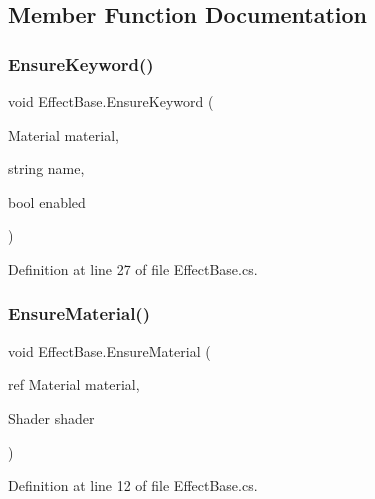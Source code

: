\subsection{Member Function Documentation}
\mbox{\label{class_effect_base_a1a5287a30815dda368c87faadf842b98}} 
\subsubsection{\texorpdfstring{Ensure\+Keyword()}{EnsureKeyword()}}
{\footnotesize\ttfamily void Effect\+Base.\+Ensure\+Keyword (\begin{DoxyParamCaption}\item[{Material}]{material,  }\item[{string}]{name,  }\item[{bool}]{enabled }\end{DoxyParamCaption})}



Definition at line 27 of file Effect\+Base.\+cs.

\mbox{\label{class_effect_base_abde71d0c91e2d28544af08b3773774fc}} 
\subsubsection{\texorpdfstring{Ensure\+Material()}{EnsureMaterial()}}
{\footnotesize\ttfamily void Effect\+Base.\+Ensure\+Material (\begin{DoxyParamCaption}\item[{ref Material}]{material,  }\item[{Shader}]{shader }\end{DoxyParamCaption})}



Definition at line 12 of file Effect\+Base.\+cs.

\mbox{\label{class_effect_base_aefffb1422e41a0b1c0889c9811b1157b}} 
